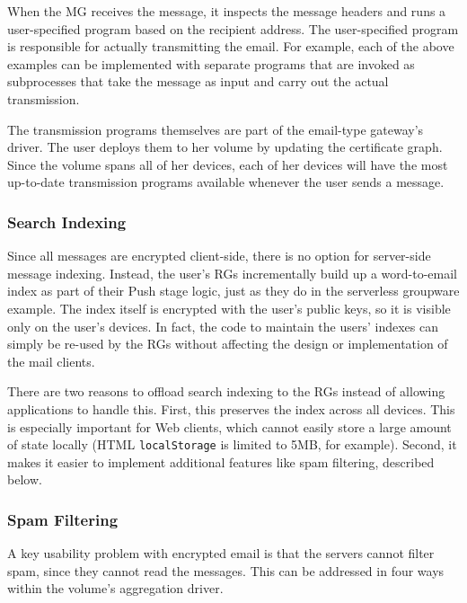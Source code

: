 When the MG receives the message, it inspects the message
headers and runs a user-specified program based on the recipient address.  The
user-specified program is responsible for actually transmitting the email.
For example, each of the above examples can be implemented with separate
programs that are invoked as subprocesses that take the message as input and
carry out the actual transmission.

The transmission programs themselves are part of the email-type gateway's driver.  The user
deploys them to her volume by updating the certificate graph.  Since the volume
spans all of her devices, each of her devices will have the most up-to-date
transmission programs available whenever the user sends a message.

\subsubsection{Search Indexing}

Since all messages are encrypted client-side, there is no option for server-side
message indexing.  Instead, the user's RGs incrementally build up a
word-to-email index as part of their Push stage logic, just as they do in the
serverless groupware example.  The index itself is
encrypted with the user's public keys, so it is visible only on the user's devices. 
In fact, the code to maintain the users' indexes can simply be re-used by the
RGs without affecting the design or implementation of the mail clients.

There are two reasons to offload search indexing to the RGs instead of allowing
applications to handle this.  First, this preserves the index across all devices. 
This is especially important for Web clients, which cannot easily store a large amount of state
locally (HTML \texttt{localStorage} is limited to 5MB, for example).  Second, it
makes it easier to implement additional features like spam filtering, described below.

\subsubsection{Spam Filtering}

A key usability problem with encrypted email is that the servers cannot filter spam,
since they cannot read the messages.  This can be addressed in four ways within
the volume's aggregation driver.


